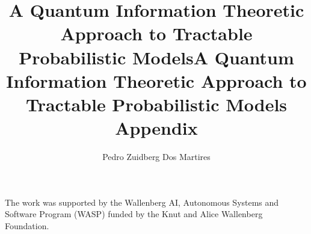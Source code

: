\documentclass[accepted]{uai2025} %
\title{A Quantum Information Theoretic Approach to Tractable Probabilistic Models}
\author{Pedro Zuidberg Dos Martires}
\affil{%
	Örebro University\\
	Sweden
}
\theoremstyle{plain}
\theoremstyle{definition}
\theoremstyle{remark}
\begin{document}
\maketitle










\begin{acknowledgements} %
	The work was supported by the Wallenberg AI, Autonomous Systems and Software Program (WASP) funded by the Knut and
	Alice Wallenberg Foundation.
\end{acknowledgements}



\clearpage


\onecolumn


\title{A Quantum Information Theoretic Approach to Tractable Probabilistic Models\\Appendix}
\appendix

\end{document}
